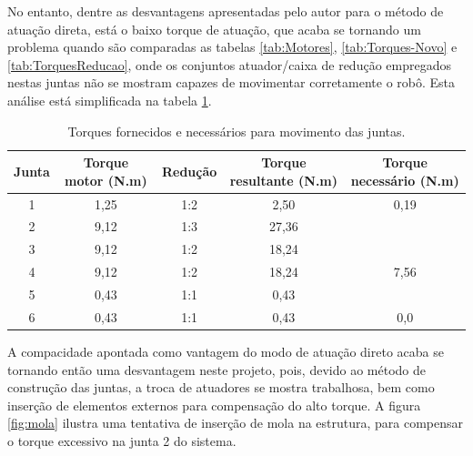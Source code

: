 No entanto, dentre as desvantagens apresentadas pelo autor
para o método de atuação direta, está o baixo torque de atuação, que acaba
se tornando um problema quando são comparadas as tabelas \ref{tab:Motores},
\ref{tab:Torques-Novo} e \ref{tab:TorquesReducao}, onde os conjuntos 
atuador/caixa de redução empregados nestas juntas não se mostram capazes
de movimentar corretamente o robô. Esta análise está simplificada na 
tabela \ref{tab:Analise-Torque}.

\begin{table}[htb]
    \begin{centering}    
    
    \caption{Torques fornecidos e necessários para movimento das juntas.}
    
    \begin{tabular}{|c|c|c|c|c|}
        \hline
        Junta & Torque motor (N.m) & Redução & Torque resultante (N.m) & Torque necessário (N.m) \tabularnewline
        \hline
        \hline
        1 & 1,25 & 1:2 &  2,50 &  0,19              \tabularnewline
        \hline
        2 & 9,12 & 1:3 & 27,36 & \color{red}{34,32} \tabularnewline
        \hline
        3 & 9,12 & 1:2 & 18,24 & \color{red}{18,81} \tabularnewline
        \hline
        4 & 9,12 & 1:2 & 18,24 & 7,56               \tabularnewline
        \hline
        5 & 0,43 & 1:1 &  0,43 & \color{red}{4,01}  \tabularnewline
        \hline
        6 & 0,43 & 1:1 &  0,43 & 0,0                \tabularnewline
        \hline
    \end{tabular}
    
    \label{tab:Analise-Torque}
    
\par\end{centering}
\end{table}

A compacidade apontada como vantagem do modo de atuação direto acaba
se tornando então uma desvantagem neste projeto, pois, devido ao método
de construção das juntas, a troca de atuadores se mostra trabalhosa,
bem como inserção de elementos externos para compensação do alto torque.
A figura \ref{fig:mola} ilustra uma tentativa de inserção de mola na 
estrutura, para compensar o torque excessivo na junta 2 do sistema.

